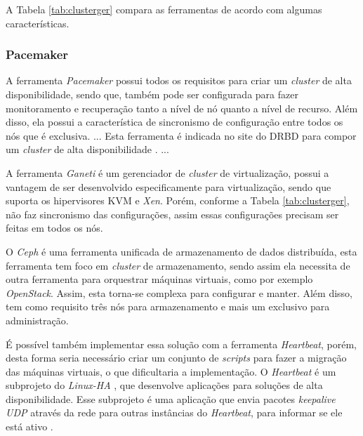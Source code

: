 A Tabela \ref{tab:clusterger} compara as ferramentas de acordo com algumas características. 


\subsubsection{Pacemaker}
\label{section:pacemaker}
A ferramenta \textit{Pacemaker}
possui todos os requisitos para criar um \textit{cluster} de alta disponibilidade, sendo que, também pode ser configurada para fazer monitoramento 
e recuperação tanto a nível de nó quanto a nível de recurso. Além disso, ela possui a característica de sincronismo de configuração entre todos
os nós que é exclusiva.
... Esta ferramenta é indicada no site do \ac{DRBD} para compor um \textit{cluster} de alta disponibilidade \cite{drbd}.
...


A ferramenta \textit{Ganeti} é um gerenciador de \textit{cluster} de virtualização, possui a vantagem de ser desenvolvido especificamente para
virtualização, sendo que suporta os hipervisores \ac{KVM} e \textit{Xen}. Porém, conforme a Tabela \ref{tab:clusterger}, não faz sincronismo
das configurações, assim essas configurações precisam ser feitas em todos os nós.

O \textit{Ceph} é uma ferramenta unificada de armazenamento de dados distribuída, esta ferramenta tem foco em \textit{cluster} de armazenamento, 
sendo assim ela necessita de outra ferramenta para orquestrar máquinas virtuais, como por exemplo \textit{OpenStack}. Assim, esta torna-se 
complexa para configurar e manter. Além disso, tem como requisito três nós para armazenamento e mais um exclusivo para administração.

É possível também implementar essa solução com a ferramenta \textit{Heartbeat}, porém, desta forma seria necessário criar um conjunto de 
\textit{scripts} para fazer a migração das máquinas virtuais, o que dificultaria a implementação.
O \textit{Heartbeat} é um subprojeto do \textit{Linux-HA} \cite{linuxha}, que desenvolve aplicações para soluções de alta disponibilidade.
Esse subprojeto é uma aplicação que envia pacotes \textit{keepalive \ac{UDP}} através da rede para outras instâncias do \textit{Heartbeat}, para
informar se ele está ativo \cite{reis2009}.

